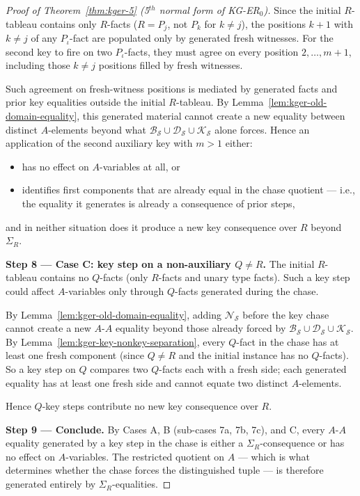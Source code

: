 \documentclass[10pt]{article}
\begin{document}
\begin{proof}[Proof of Theorem~\ref{thm:kger-5} (5$^{th}$ normal form of KG-ER$_0$)]
Since the initial \(R\)-tableau contains only \(R\)-facts
(\(R=P_j\), not \(P_k\) for \(k\neq j\)), the positions \(k+1\) with
\(k\neq j\) of any \(P_\iota\)-fact are populated only by generated
fresh witnesses.  For the second key to fire on two \(P_\iota\)-facts,
they must agree on every position \(2,\ldots,m+1\), including those
\(k\neq j\) positions filled by fresh witnesses.

Such agreement on fresh-witness positions is mediated by generated
facts and prior key equalities outside the initial \(R\)-tableau.  By
Lemma~\ref{lem:kger-old-domain-equality}, this generated material
cannot create a new equality between distinct \(A\)-elements beyond
what \(\mathcal B_{\mathcal S}\cup\mathcal D_{\mathcal S}\cup
\mathcal K_{\mathcal S}\) alone forces.  Hence an application of the
second auxiliary key with \(m>1\) either:
\begin{itemize}
\item has no effect on \(A\)-variables at all, or
\item identifies first components that are already equal in the chase
quotient --- i.e., the equality it generates is already a consequence
of prior steps,
\end{itemize}
and in neither situation does it produce a new key consequence over
\(R\) beyond \(\Sigma_R\).

\smallskip\noindent\textbf{Step 8 --- Case C: key step on a
non-auxiliary \(Q\neq R\).}
The initial \(R\)-tableau contains no \(Q\)-facts (only \(R\)-facts
and unary type facts).  Such a key step could affect \(A\)-variables
only through \(Q\)-facts generated during the chase.

By Lemma~\ref{lem:kger-old-domain-equality}, adding
\(\mathcal N_{\mathcal S}\) before the key chase cannot create a new
\(A\)-\(A\) equality beyond those already forced by
\(\mathcal B_{\mathcal S}\cup\mathcal D_{\mathcal S}\cup
\mathcal K_{\mathcal S}\).  By Lemma~\ref{lem:kger-key-nonkey-separation},
every \(Q\)-fact in the chase has at least one fresh component (since
\(Q\neq R\) and the initial instance has no \(Q\)-facts).  So a key
step on \(Q\) compares two \(Q\)-facts each with a fresh side; each
generated equality has at least one fresh side and cannot equate two
distinct \(A\)-elements.

Hence \(Q\)-key steps contribute no new key consequence over \(R\).

\smallskip\noindent\textbf{Step 9 --- Conclude.}
By Cases A, B (sub-cases 7a, 7b, 7c), and C, every \(A\)-\(A\)
equality generated by a key step in the chase is either a
\(\Sigma_R\)-consequence or has no effect on \(A\)-variables.  The
restricted quotient on \(A\) --- which is what determines whether the
chase forces the distinguished tuple --- is therefore generated
entirely by \(\Sigma_R\)-equalities.


\end{proof}
\end{document}
